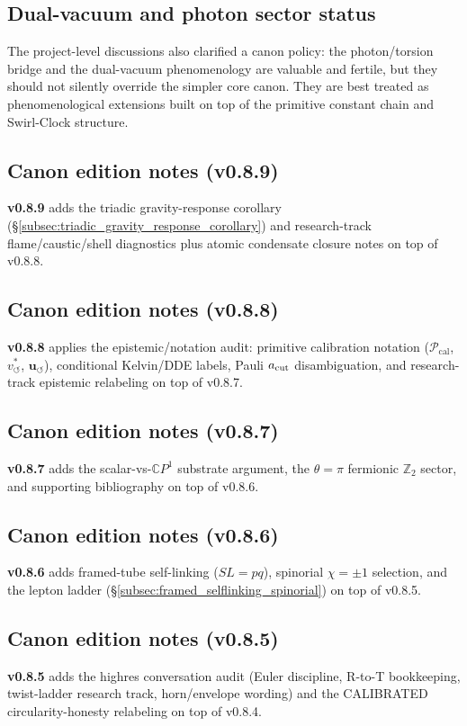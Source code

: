 \documentclass[11pt]{article}
\theoremstyle{definition}
\theoremstyle{plain}
\theoremstyle{remark}
\newcommand{\vchar}{v_{\!\boldsymbol{\circlearrowleft}}^{\ast}}
\newcommand{\uswirl}{\mathbf{u}_{\!\boldsymbol{\circlearrowleft}}}
\begin{document}
        \subsection{Dual-vacuum and photon sector status}
            The project-level discussions also clarified a canon policy: the photon/torsion bridge and the dual-vacuum phenomenology are valuable and fertile, but they should not silently override the simpler core canon. They are best treated as phenomenological extensions built on top of the primitive constant chain and Swirl-Clock structure.

        \subsection{Canon edition notes (v0.8.9)}
            \textbf{v0.8.9} adds the triadic gravity-response corollary (\S\ref{subsec:triadic_gravity_response_corollary}) and research-track flame/caustic/shell diagnostics plus atomic condensate closure notes on top of v0.8.8.

        \subsection{Canon edition notes (v0.8.8)}
            \textbf{v0.8.8} applies the epistemic/notation audit: primitive calibration notation ($\mathcal{P}_{\mathrm{cal}}$, $\vchar$, $\uswirl$), conditional Kelvin/DDE labels, Pauli $a_{\rm cut}$ disambiguation, and research-track epistemic relabeling on top of v0.8.7.

        \subsection{Canon edition notes (v0.8.7)}
            \textbf{v0.8.7} adds the scalar-vs-$\mathbb{C}P^1$ substrate argument, the $\theta=\pi$ fermionic $\mathbb{Z}_2$ sector, and supporting bibliography on top of v0.8.6.

        \subsection{Canon edition notes (v0.8.6)}
            \textbf{v0.8.6} adds framed-tube self-linking ($SL=pq$), spinorial $\chi=\pm1$ selection, and the lepton ladder (\S\ref{subsec:framed_selflinking_spinorial}) on top of v0.8.5.

        \subsection{Canon edition notes (v0.8.5)}
            \textbf{v0.8.5} adds the highres conversation audit (Euler discipline, R-to-T bookkeeping, twist-ladder research track, horn/envelope wording) and the CALIBRATED circularity-honesty relabeling on top of v0.8.4.
\end{document}
